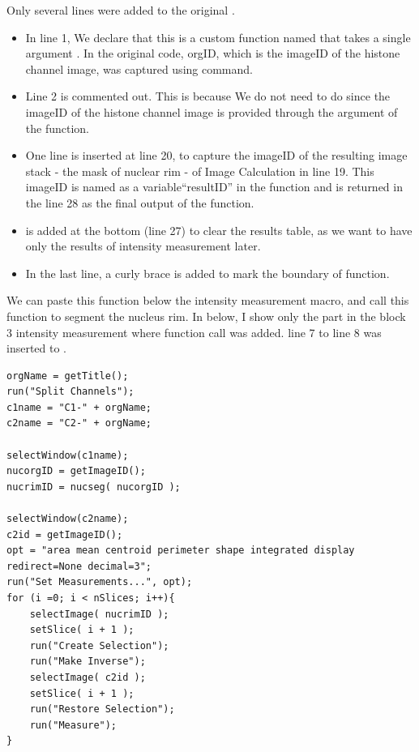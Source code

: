 Only several lines were added to the original . 

\begin{itemize}
    \item In line 1, We declare that this is a custom function named  that takes a single argument . In the original code, orgID, which is the imageID of the histone channel image, was captured using  command. 
    \item Line 2 is commented out. This is because We do not need to do  since the imageID of the  histone channel image is provided through the argument of the function.  
    \item One line is inserted at line 20, to capture the imageID of the resulting image stack - the mask of nuclear rim - of Image Calculation in line 19. This imageID is named as a variable``resultID'' in the function and is returned in the line 28 as the final output of the function.
    \item {} is added at the bottom (line 27) to clear the results table, as we want to have only the results of intensity measurement later.
    \item  In the last line, a curly brace is added to mark the boundary of function.
\end{itemize}

We can paste this function  below the intensity measurement macro, and call this function to segment the nucleus rim. In below, I show only the part in the block 3 intensity measurement where function call was added. line 7 to line 8 was inserted to . 

\begin{lstlisting}
orgName = getTitle();
run("Split Channels");
c1name = "C1-" + orgName;
c2name = "C2-" + orgName;

selectWindow(c1name);
nucorgID = getImageID();
nucrimID = nucseg( nucorgID );

selectWindow(c2name);
c2id = getImageID();
opt = "area mean centroid perimeter shape integrated display redirect=None decimal=3";
run("Set Measurements...", opt);
for (i =0; i < nSlices; i++){
    selectImage( nucrimID );
    setSlice( i + 1 );
    run("Create Selection");
    run("Make Inverse");
    selectImage( c2id );
    setSlice( i + 1 );
    run("Restore Selection");
    run("Measure");
}
\end{lstlisting}


